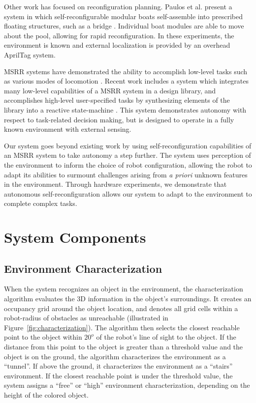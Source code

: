 \documentclass[12pt]{article}
\begin{document}
Other work has focused on reconfiguration planning.  Paulos et al. present a system in which self-reconfigurable modular boats self-assemble into prescribed floating structures, such as a bridge \cite{Paulos2015}.  Individual boat modules are able to move about the pool, allowing for rapid reconfiguration.  In these experiments, the environment is known and external localization is provided by an overhead AprilTag system. 

MSRR systems have demonstrated the ability to accomplish low-level tasks such as various modes of locomotion \cite{Yim1994}.
Recent work includes a system which integrates many low-level capabilities of a MSRR system in a design library, and accomplishes high-level user-specified tasks by synthesizing elements of the library into a reactive state-machine \cite{Jing2016}. This system demonstrates autonomy with respect to task-related decision making, but is designed to operate in a fully known environment with external sensing.

Our system goes beyond existing work by using self-reconfiguration capabilities of an MSRR system to take autonomy a step further.  The system uses perception of the environment to inform the choice of robot configuration, allowing the robot to adapt its abilities to surmount challenges arising from \textit{a priori} unknown features in the environment. Through hardware experiments, we demonstrate that autonomous self-reconfiguration allows our system to adapt to the environment to complete complex tasks.



\section{System Components}

\subsection{Environment Characterization}
When the system recognizes an object in the environment, the characterization algorithm evaluates the 3D information in the object's surroundings. It creates an occupancy grid around the object location, and denotes all grid cells within a robot-radius of obstacles as unreachable (illustrated in Figure~\ref{fig:characterization}). The algorithm then selects the closest reachable point to the object within $20^o$ of the robot's line of sight to the object. If the distance from this point to the object is greater than a threshold value and the object is on the ground, the algorithm characterizes the environment as a ``tunnel''. If above the ground, it characterizes the environment as a ``stairs'' environment. If the closest reachable point is under the threshold value, the system assigns a ``free'' or ``high'' environment characterization, depending on the height of the colored object.
\end{document}
